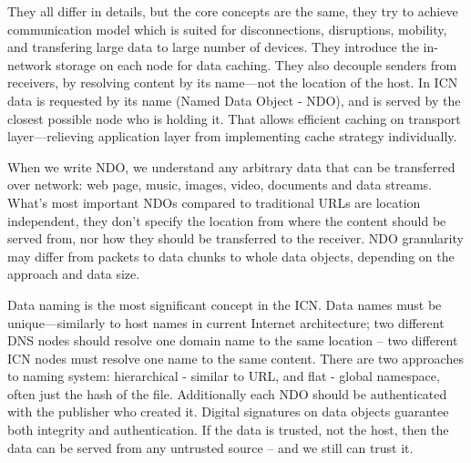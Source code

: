 \documentclass[nostrict]{szablonPG}
\begin{document}
They all differ in details, but the core concepts are the same, they try to achieve communication model which is suited for disconnections, disruptions, mobility, and transfering large data to large number of devices. They introduce the in-network storage on each node for data caching. They also decouple senders from receivers, by resolving content by its name---not the location of the host. 
In ICN data is requested by its name (Named Data Object - NDO), and is served by the closest possible node who is holding it. That allows efficient caching on transport layer---relieving application layer from implementing cache strategy individually. 

When we write NDO, we understand any arbitrary data that can be transferred over network: web page, music, images, video, documents and data streams. What's most important NDOs compared to traditional URLs are location independent, they don't specify the location from where the content should be served from, nor how they should be transferred to the receiver. NDO granularity may differ from packets to data chunks to whole data objects, depending on the approach and data size.

Data naming is the most significant concept in the ICN. Data names must be unique---similarly to host names in current Internet architecture; two different DNS nodes should resolve one domain name to the same location -- two different ICN nodes must resolve one name to the same content. 
There are two approaches to naming system: hierarchical - similar to URL, and flat - global namespace, often just the hash of the file.
Additionally each NDO should be authenticated with the publisher who created it. Digital signatures on data objects guarantee both integrity and authentication. If the data is trusted, not the host, then the data can be served from any untrusted source -- and we still can trust it.
\end{document}
